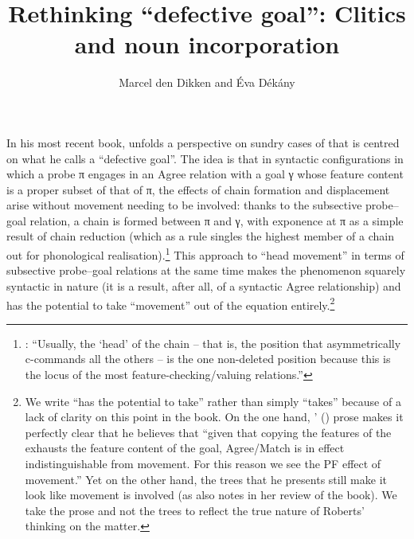 \documentclass[output=paper]{langsci/langscibook}
\author{Marcel den Dikken\affiliation{Eötvös University; RIL HAS} and
Éva Dékány\affiliation{RIL HAS}}
\title{Rethinking ``defective goal'': Clitics and noun incorporation}
\begin{document}
\glsresetall
\maketitle
\begin{refcontext}

In his most recent book, \cite{Roberts2010} unfolds a perspective on sundry cases
of  that is centred on what he calls a \enquote{defective goal}.
The idea is that in syntactic configurations in which a probe π engages in
an Agree relation with a goal γ whose feature content is a proper subset
of that of π, the effects of chain formation and displacement arise without
movement needing to be involved: thanks to the subsective probe--goal relation,
a chain is formed between π and γ, with exponence at π as a
simple result of chain reduction (which as a rule singles the highest member of
a chain out for phonological realisation).\footnote{\citet[61]{Roberts2010}:
    \enquote{Usually, the \enquote{head} of the chain -- that is, the
        position that asymmetrically c-commands all the others -- is the one
        non-deleted position because this is the locus of the most
        feature-checking/valuing relations.}} This approach to \enquote{head
    movement} in terms of subsective probe–goal relations at the same time
    makes the phenomenon squarely syntactic in nature (it is a result, after
    all, of a syntactic Agree relationship) and has the potential to take
    \enquote{movement} out of the equation entirely.\footnote{We write
        \enquote{has the potential to take} rather than simply
        \enquote{takes} because of a lack of clarity on this point in the
        book. On the one hand, \citeauthor{Roberts2010}'
        (\citeyear[160]{Roberts2010}) prose makes it perfectly clear that he
        believes that \enquote{given that copying the features of the
             exhausts the feature content of the goal,
        Agree/Match is in effect indistinguishable from movement. For this
    reason we see the PF effect of movement.} Yet on the other hand, the trees
    that he presents still make it look like movement is involved (as
    \citealt{matushanskyrobertsreview} also notes in her review of the book).
    We take the prose and not the trees to reflect the true nature of Roberts’
thinking on the matter.}


\end{refcontext}
\end{document}
